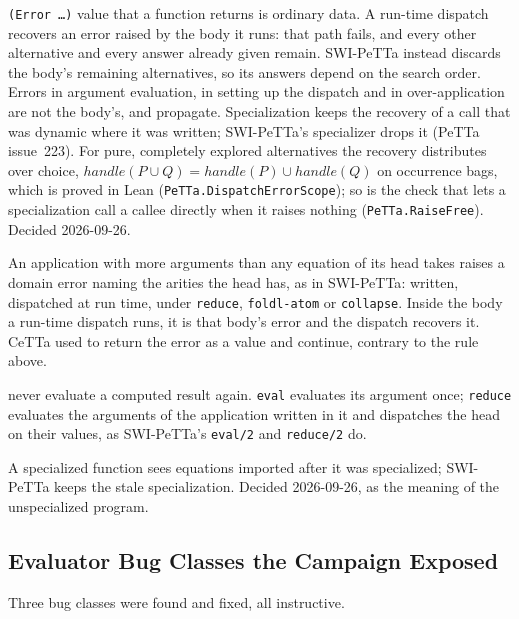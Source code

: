 \documentclass[11pt]{article}
\newcommand{\code}[1]{\texttt{#1}}
\newcommand{\PeTTa}{\textup{PeTTa}}
\newcommand{\CeTTa}{\textup{CeTTa}}
\begin{document}
\begin{description}
  \code{(Error \ldots)} value that a function returns is ordinary data.  A
  run-time dispatch recovers an error raised by the body it runs: that
  path fails, and every other alternative and every answer already given
  remain.  SWI-\PeTTa{} instead discards the body's remaining
  alternatives, so its answers depend on the search order.  Errors in
  argument evaluation, in setting up the dispatch and in over-application
  are not the body's, and propagate.  Specialization keeps the recovery
  of a call that was dynamic where it was written; SWI-\PeTTa{}'s
  specializer drops it (\PeTTa{} issue~223).  For pure, completely explored
  alternatives the recovery distributes over choice,
  $\mathit{handle}(P \cup Q) = \mathit{handle}(P) \cup
  \mathit{handle}(Q)$ on occurrence bags, which is proved in Lean
  (\code{PeTTa.DispatchErrorScope}); so is the check that lets a
  specialization call a callee directly when it raises nothing
  (\code{PeTTa.RaiseFree}).  Decided 2026-09-26.
\item[Over-application.] An application with more arguments than any
  equation of its head takes raises a domain error naming the arities the
  head has, as in SWI-\PeTTa{}: written, dispatched at run time, under
  \code{reduce}, \code{foldl-atom} or \code{collapse}.  Inside the body a
  run-time dispatch runs, it is that body's error and the dispatch
  recovers it.  \CeTTa{} used to return the error as a value and
  continue, contrary to the rule above.
\item[\code{eval} and \code{reduce}] never evaluate a computed result
  again.  \code{eval} evaluates its argument once; \code{reduce}
  evaluates the arguments of the application written in it and
  dispatches the head on their values, as SWI-\PeTTa{}'s \code{eval/2}
  and \code{reduce/2} do.
\item[Imports invalidate specializations.] A specialized function sees
  equations imported after it was specialized; SWI-\PeTTa{} keeps the
  stale specialization.  Decided 2026-09-26, as the meaning of the
  unspecialized program.
\end{description}

\subsection{Evaluator Bug Classes the Campaign Exposed}
\label{sec:bugclasses}

Three bug classes were found and fixed, all instructive.
\end{document}
